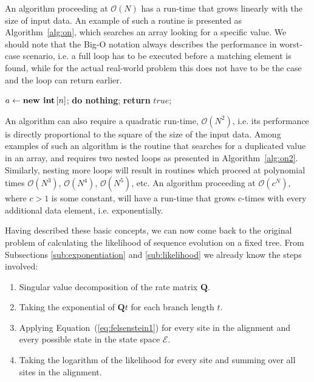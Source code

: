 An algorithm proceeding at $\mathcal{O}\left(N\right)$ has a run-time that grows linearly with the size of input data.
An example of such a routine is presented as Algorithm~\ref{alg:on}, which searches an array looking for a specific value.
We should note that the Big-O notation always describes the performance in worst-case scenario, i.e. a full loop has to be executed before a matching element is found, while for the actual real-world problem this does not have to be the case and the loop can return earlier.

\begin{algorithm}[H]
\centering
\begin{algorithmic}[1]
\State $a \gets \text{\textbf{new int}}\left[n\right]$;
%
%
%
%
\State \textbf{do nothing};
%
\Else 
%
%
\State \textbf{return} $true$;
%
\EndIf
%
\EndIf {}
%
\EndFor {}
%
\EndFor {}
\end{algorithmic}
\caption{
{ \footnotesize 
{\bf Search for the first duplicated value.} 
}%
}
\label{alg:on2}
\end{algorithm}

An algorithm can also require a quadratic run-time, $\mathcal{O}\left(N^2\right)$, i.e. its performance is directly proportional to the square of the size of the input data.
Among examples of such an algorithm is the routine that searches for a duplicated value in an array, and requires two nested loops as presented in Algorithm~\ref{alg:on2}.
Similarly, nesting more loops will result in routines which proceed at polynomial times $\mathcal{O}\left(N^3\right)$, $\mathcal{O}\left(N^4\right)$, $\mathcal{O}\left(N^5\right)$, etc.
An algorithm proceeding at $\mathcal{O}\left(c^N\right)$, where $c>1$ is some constant, will have a run-time that grows c-times with every additional data element, i.e. exponentially. 

Having described these basic concepts, we can now come back to the original problem of calculating the likelihood of sequence evolution on a fixed tree.
From Subsections \ref{sub:exponentiation} and \ref{sub:likelihood} we already know the steps involved:

\begin{enumerate}
\item { Singular value decomposition of the rate matrix $\mathbf{Q}$. }
\item { Taking the exponential of $\mathbf{Q}t$ for each branch length $t$. }
\item { Applying Equation~(\ref{eq:felsenstein1}) for every site in the alignment and every possible state in the state space $\mathcal{E}$. }
\item { Taking the logarithm of the likelihood for every site and summing over all sites in the alignment. }
\end{enumerate}

